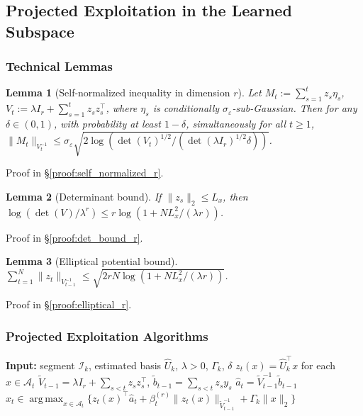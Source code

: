 \documentclass{article}
\newcommand{\cA}{\mathcal{A}}
\newcommand{\cI}{\mathcal{I}}
\DeclareMathOperator*{\argmax}{arg\,max}
\newtheorem{lemma}{Lemma}
\begin{document}
\subsection{Projected Exploitation in the Learned Subspace}
\label{app:projected_exploitation}

\subsubsection{Technical Lemmas}

\begin{lemma}[Self-normalized inequality in dimension $r$]
\label{lem:self_normalized_r}
Let $M_t := \sum_{s=1}^t z_s \eta_s$, $V_t := \lambda I_r + \sum_{s=1}^t z_s z_s^\top$, where $\eta_s$ is conditionally $\sigma_\varepsilon$-sub-Gaussian. Then for any $\delta\in(0,1)$, with probability at least $1-\delta$, simultaneously for all $t\ge 1$,
$\|M_t\|_{V_t^{-1}} \le \sigma_\varepsilon \sqrt{2\log(\det(V_t)^{1/2}/(\det(\lambda I_r)^{1/2}\delta))}$.
\end{lemma}

Proof in \S\ref{proof:self_normalized_r}.

\begin{lemma}[Determinant bound]
\label{lem:det_bound_r}
If $\|z_s\|_2\le L_x$, then $\log(\det(V)/\lambda^r) \le r\log(1+N L_x^2/(\lambda r))$.
\end{lemma}

Proof in \S\ref{proof:det_bound_r}.

\begin{lemma}[Elliptical potential bound]
\label{lem:elliptical_r}
$\sum_{t=1}^N \|z_t\|_{V_{t-1}^{-1}} \le \sqrt{2rN\log(1+N L_x^2/(\lambda r))}$.
\end{lemma}

Proof in \S\ref{proof:elliptical_r}.

\subsubsection{Projected Exploitation Algorithms}

\begin{algorithm}[!htpb]
\caption{Segmentwise projected ridge-UCB in the learned subspace}
\label{alg:segment_projected_ofu}
\begin{algorithmic}[1]
\State \textbf{Input:} segment $\cI_k$, estimated basis $\widehat U_k$, $\lambda>0$, $\Gamma_k$, $\delta$
    \State $z_t(x)=\widehat U_k^\top x$ for each $x \in \cA_t$
    \State $\widetilde V_{t-1} = \lambda I_r + \sum_{s<t} z_s z_s^\top$, \; $\widetilde b_{t-1} = \sum_{s<t} z_s y_s$
    \State $\widehat a_t = \widetilde V_{t-1}^{-1}\widetilde b_{t-1}$
    \State $x_t \in \argmax_{x\in \cA_t}\{z_t(x)^\top \widehat a_t + \beta_t^{(r)}\|z_t(x)\|_{\widetilde V_{t-1}^{-1}} + \Gamma_k\|x\|_2\}$
\EndFor
\end{algorithmic}
\end{algorithm}
\end{document}
